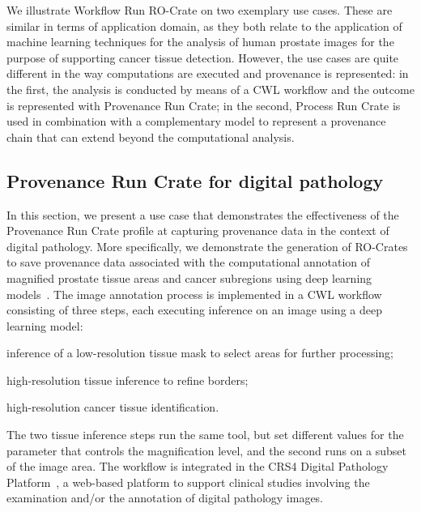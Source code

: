 We illustrate Workflow Run RO-Crate on two exemplary use cases. These are similar in terms of application domain, as they both relate to the application of machine learning techniques for the analysis of human prostate images for the purpose of supporting cancer tissue detection. However, the use cases are quite different in the way computations are executed and provenance is represented: in the first, the analysis is conducted by means of a CWL workflow and the outcome is represented with Provenance Run Crate; in the second, Process Run Crate is used in combination with a complementary model to represent a provenance chain that can extend beyond the computational analysis.


\subsection{Provenance Run Crate for digital pathology}\label{wrroc:provenance-run-crate-for-digital-pathology}

In this section, we present a use case that demonstrates the effectiveness of the Provenance Run Crate profile at capturing provenance data in the context of digital pathology.
More specifically, we demonstrate the generation of RO-Crates to save provenance data associated with the computational annotation of magnified prostate tissue areas and cancer subregions using deep learning models~\cite{Del Rio 2022}.
The image annotation process is implemented in a CWL workflow consisting of three steps, each executing inference on an image using a deep learning model: \begin{inlineenum}
\item inference of a low-resolution tissue mask to select areas for further processing;
\item high-resolution tissue inference to refine borders;
\item high-resolution cancer tissue identification.
\end{inlineenum}
The two tissue inference steps run the same tool, but set different values for the parameter that controls the magnification level, and the second runs on a subset of the image area.
The workflow is integrated in the CRS4 Digital Pathology Platform~\cite{digital-pathology-platform}, a web-based platform to support clinical studies involving the examination and/or the annotation of digital pathology images.

